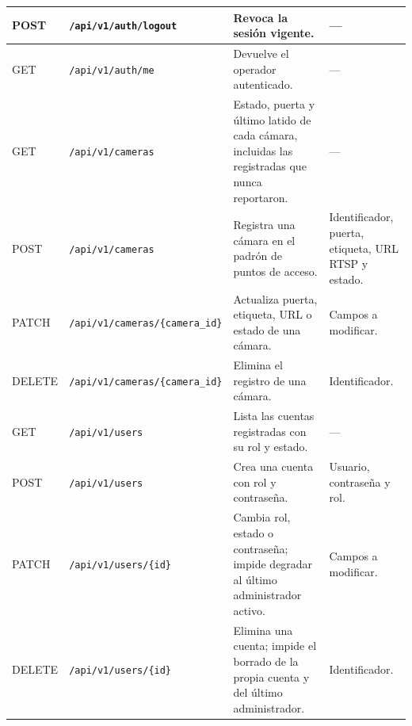 \begin{longtable}{
        P{0.09}
        P{0.27}
        P{0.34}
        P{0.20}
    }
    POST & \texttt{/\allowbreak{}api/\allowbreak{}v1/\allowbreak{}auth/\allowbreak{}logout} & Revoca la sesión vigente. & — \\
    \midrule

    GET & \texttt{/\allowbreak{}api/\allowbreak{}v1/\allowbreak{}auth/\allowbreak{}me} & Devuelve el operador autenticado. & — \\
    \midrule

    GET & \texttt{/\allowbreak{}api/\allowbreak{}v1/\allowbreak{}cameras} & Estado, puerta y último latido de cada cámara, incluidas
    las registradas que nunca reportaron. & — \\
    \midrule

    POST & \texttt{/\allowbreak{}api/\allowbreak{}v1/\allowbreak{}cameras} & Registra una cámara en el padrón de puntos de acceso.
    & Identificador, puerta, etiqueta, URL RTSP y estado. \\
    \midrule

    PATCH & \texttt{/\allowbreak{}api/\allowbreak{}v1/\allowbreak{}cameras/\allowbreak{}\{camera\_id\}} & Actualiza puerta, etiqueta, URL o estado de una cámara. & Campos a modificar. \\
    \midrule

    DELETE & \texttt{/\allowbreak{}api/\allowbreak{}v1/\allowbreak{}cameras/\allowbreak{}\{camera\_id\}} & Elimina el registro de una cámara. & Identificador. \\
    \midrule

    GET & \texttt{/\allowbreak{}api/\allowbreak{}v1/\allowbreak{}users} & Lista las cuentas registradas con su rol y estado. & — \\
    \midrule

    POST & \texttt{/\allowbreak{}api/\allowbreak{}v1/\allowbreak{}users} & Crea una cuenta con rol y contraseña. & Usuario, contraseña y rol. \\
    \midrule

    PATCH & \texttt{/\allowbreak{}api/\allowbreak{}v1/\allowbreak{}users/\allowbreak{}\{id\}} & Cambia rol, estado o contraseña; impide degradar al último
    administrador activo. & Campos a modificar. \\
    \midrule

    DELETE & \texttt{/\allowbreak{}api/\allowbreak{}v1/\allowbreak{}users/\allowbreak{}\{id\}} & Elimina una cuenta; impide el borrado de la propia cuenta y
    del último administrador. & Identificador. \\
    \midrule


\end{longtable}
